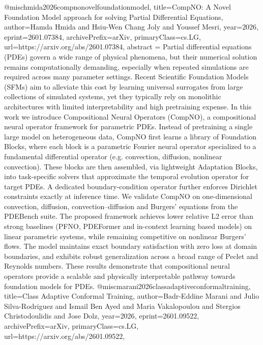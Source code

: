 {}@misc{hmida2026compnonovelfoundationmodel,
      title={CompNO: A Novel Foundation Model approach for solving Partial Differential Equations}, 
      author={Hamda Hmida and Hsiu-Wen Chang Joly and Youssef Mesri},
      year={2026},
      eprint={2601.07384},
      archivePrefix={arXiv},
      primaryClass={cs.LG},
      url={https://arxiv.org/abs/2601.07384},
      abstract = {Partial differential equations (PDEs) govern a wide range of physical phenomena, but their numerical solution remains computationally demanding, especially when repeated simulations are required across many parameter settings. Recent Scientific Foundation Models (SFMs) aim to alleviate this cost by learning universal surrogates from large collections of simulated systems, yet they typically rely on monolithic architectures with limited interpretability and high pretraining expense. In this work we introduce Compositional Neural Operators (CompNO), a compositional neural operator framework for parametric PDEs. Instead of pretraining a single large model on heterogeneous data, CompNO first learns a library of Foundation Blocks, where each block is a parametric Fourier neural operator specialized to a fundamental differential operator (e.g. convection, diffusion, nonlinear convection). These blocks are then assembled, via lightweight Adaptation Blocks, into task-specific solvers that approximate the temporal evolution operator for target PDEs. A dedicated boundary-condition operator further enforces Dirichlet constraints exactly at inference time. We validate CompNO on one-dimensional convection, diffusion, convection--diffusion and Burgers' equations from the PDEBench suite. The proposed framework achieves lower relative L2 error than strong baselines (PFNO, PDEFormer and in-context learning based models) on linear parametric systems, while remaining competitive on nonlinear Burgers' flows. The model maintains exact boundary satisfaction with zero loss at domain boundaries, and exhibits robust generalization across a broad range of Peclet and Reynolds numbers. These results demonstrate that compositional neural operators provide a scalable and physically interpretable pathway towards foundation models for PDEs.}
}@misc{marani2026classadaptiveconformaltraining,
      title={Class Adaptive Conformal Training}, 
      author={Badr-Eddine Marani and Julio Silva-Rodriguez and Ismail Ben Ayed and Maria Vakalopoulou and Stergios Christodoulidis and Jose Dolz},
      year={2026},
      eprint={2601.09522},
      archivePrefix={arXiv},
      primaryClass={cs.LG},
      url={https://arxiv.org/abs/2601.09522},
}
